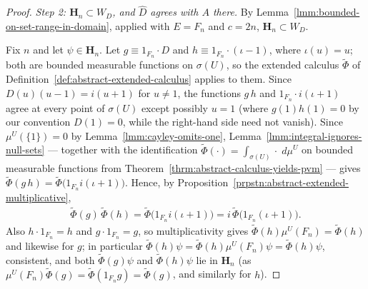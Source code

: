 \begin{proof}
\textit{Step 2: $\mathbf{H}_n \subset W_D$, and $\widehat{D}$ agrees with $A$ there.} By Lemma~\ref{lmm:bounded-on-set-range-in-domain}, applied with $E = F_n$ and $c = 2n$, $\mathbf{H}_n \subset W_D$.

Fix $n$ and let $\psi \in \mathbf{H}_n$. Let $g \equiv 1_{F_n}\cdot D$ and $h \equiv 1_{F_n}\cdot (\iota - 1)$, where $\iota(u) = u$; both are bounded measurable functions on $\sigma(U)$, so the extended calculus $\widetilde\Phi$ of Definition~\ref{def:abstract-extended-calculus} applies to them. Since $D(u)(u-1) = i(u+1)$ for $u \ne 1$, the functions $g\,h$ and $1_{F_n}\cdot i(\iota+1)$ agree at every point of $\sigma(U)$ except possibly $u = 1$ (where $g(1)h(1) = 0$ by our convention $D(1) = 0$, while the right-hand side need not vanish). Since $\mu^U(\{1\}) = 0$ by Lemma~\ref{lmm:cayley-omits-one}, Lemma~\ref{lmm:integral-ignores-null-sets} — together with the identification $\widetilde\Phi(\cdot) = \int_{\sigma(U)} \cdot \; d\mu^U$ on bounded measurable functions from Theorem~\ref{thrm:abstract-calculus-yields-pvm} — gives $\widetilde\Phi(g\,h) = \widetilde\Phi\big(1_{F_n}i(\iota+1)\big)$. Hence, by Proposition~\ref{prpstn:abstract-extended-multiplicative},
\begin{align}
    \widetilde\Phi(g)\,\widetilde\Phi(h) = \widetilde\Phi\big( 1_{F_n} i(\iota+1) \big) = i\,\widetilde\Phi\big(1_{F_n}(\iota+1)\big). \tag{$\smile$}
\end{align}
Also $h \cdot 1_{F_n} = h$ and $g \cdot 1_{F_n} = g$, so multiplicativity gives $\widetilde\Phi(h)\mu^U(F_n) = \widetilde\Phi(h)$ and likewise for $g$; in particular $\widetilde\Phi(h)\psi = \widetilde\Phi(h)\mu^U(F_n)\psi = \widetilde\Phi(h)\psi$, consistent, and both $\widetilde\Phi(g)\psi$ and $\widetilde\Phi(h)\psi$ lie in $\mathbf{H}_n$ (as $\mu^U(F_n)\widetilde\Phi(g) = \widetilde\Phi(1_{F_n}g) = \widetilde\Phi(g)$, and similarly for $h$).


\end{proof}
